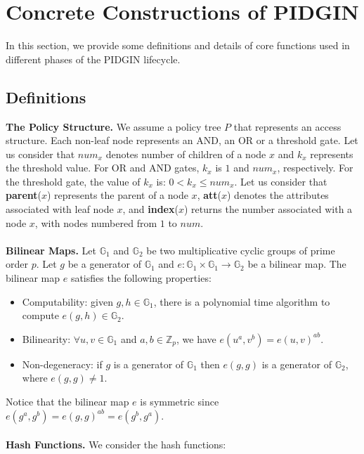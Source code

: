 \documentclass[epsfig,a4paper,11pt,titlepage]{book}
\numberwithin{algorithm}{chapter}
\begin{document}
\section[Concrete Constructions of PIDGIN]{Concrete Constructions of \gls{PIDGIN}}
\label{sec:pidgin-construction}







In this section, we provide some definitions and details of core functions used in different phases of the \gls{PIDGIN} lifecycle.



\subsection{Definitions}

\noindent \textbf{The Policy Structure.} We assume a policy tree $P$ that represents an access structure. Each non-leaf node represents an AND, an OR or a threshold gate. Let us consider that $num_x$ denotes number of children of a node $x$ and $k_x$ represents the threshold value. For OR and AND gates, $k_x$ is $1$ and $num_x$, respectively. For the threshold gate, the value of $k_x$ is: $0 < k_x \leq num_x$. Let us consider that \textbf{parent}($x$) represents the parent of a node $x$, \textbf{att}($x$) denotes the attributes associated with leaf node $x$, and \textbf{index}($x$) returns the number associated with a node $x$, with nodes numbered from $1$ to $num$. \\ \\
\textbf{Bilinear Maps.} Let $\mathbb{G}_1$ and $\mathbb{G}_2$ be two multiplicative cyclic groups of prime order $p$. Let $g$ be a generator of $\mathbb{G}_1$ and $e : \mathbb{G}_1 \times \mathbb{G}_1 \rightarrow \mathbb{G}_2$ be a bilinear map. The bilinear map $e$ satisfies the following properties:

\begin{itemize}
	\item Computability: given $g, h \in \mathbb{G}_1$, there is a polynomial time algorithm to compute $e(g, h) \in \mathbb{G}_2$.
	\item Bilinearity: $\forall u, v \in \mathbb{G}_1$ and $a, b \in \mathbb{Z}_p$, we have $e(u^a, v^b) = e(u, v)^{ab}$.
	\item Non-degeneracy: if $g$ is a generator of $\mathbb{G}_1$ then $e(g, g)$ is a generator of $\mathbb{G}_2$, where $e(g, g) \neq 1$.
\end{itemize}
Notice that the bilinear map $e$ is symmetric since $e(g^a, g^b) = e(g, g)^{ab} = e(g^b, g^a)$. \\ \\
\textbf{Hash Functions.} We consider the hash functions: 
\end{document}
